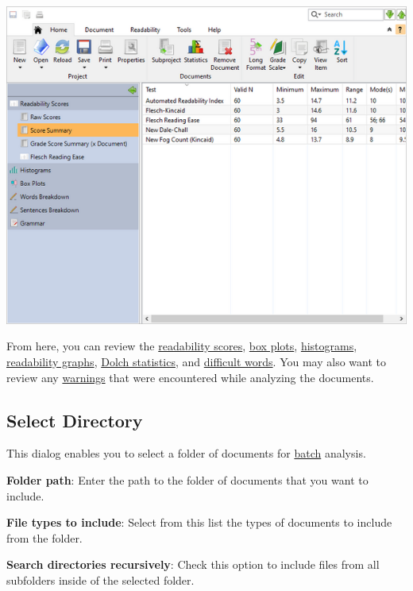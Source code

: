 \documentclass[
]{book}
\theoremstyle{definition}
\theoremstyle{definition}
\theoremstyle{definition}
\theoremstyle{definition}
\theoremstyle{remark}
\begin{document}
\includegraphics{Images/batchscorestats.png}

From here, you can review the \protect\hyperlink{reviewing-batch-scores}{readability scores}, \protect\hyperlink{reviewing-batch-box-plots}{box plots}, \protect\hyperlink{reviewing-batch-histograms}{histograms}, \protect\hyperlink{reviewing-readability-graphs}{readability graphs}, \protect\hyperlink{reviewing-batch-dolch}{Dolch statistics}, and \protect\hyperlink{reviewing-batch-words}{difficult words}. You may also want to review any \protect\hyperlink{reviewing-batch-warnings}{warnings} that were encountered while analyzing the documents.

\hypertarget{select-directory}{%
\subsection*{Select Directory}\label{select-directory}}

This dialog enables you to select a folder of documents for \protect\hyperlink{creating-batch-project}{batch} analysis.

\textbf{Folder path}: Enter the path to the folder of documents that you want to include.

\textbf{File types to include}: Select from this list the types of documents to include from the folder.

\textbf{Search directories recursively}: Check this option to include files from all subfolders inside of the selected folder.
\end{document}

